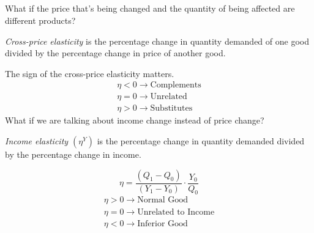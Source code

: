 \subsection{}
What if the price that's being changed and the quantity of being affected are different products?
\begin{definition}
    \emph{Cross-price elasticity} is the percentage change in quantity demanded of one good divided by the percentage change in price of another good.
\end{definition}
The sign of the cross-price elasticity matters.
\begin{gather}
    \eta<0 \rightarrow \text{Complements}\\
    \eta=0 \rightarrow \text{Unrelated}\\
    \eta>0 \rightarrow \text{Substitutes}
\end{gather}
What if we are talking about income change instead of price change?
\begin{definition}
    \emph{Income elasticity $(\eta^Y)$} is the percentage change in quantity demanded divided by the percentage change in income.
\end{definition}
\begin{equation}
    \eta=\frac{(Q_1-Q_0)}{(Y_1-Y_0)}\cdot\frac{Y_0}{Q_0}
\end{equation}
\begin{gather}
    \eta>0 \rightarrow \text{Normal Good}\\
    \eta=0 \rightarrow \text{Unrelated to Income}\\
    \eta<0 \rightarrow \text{Inferior Good}
\end{gather}